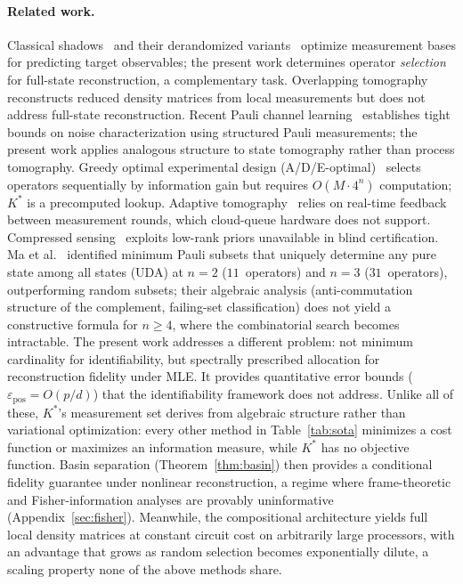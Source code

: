 \documentclass[twocolumn,prx,aps,superscriptaddress,longbibliography,floatfix]{revtex4-2}
\begin{document}
\paragraph{Related work.}
Classical shadows~\cite{Aaronson2018,Huang2020,Acharya2021,King2025} and
their derandomized
variants~\cite{Huang2021,Hadfield2022} optimize measurement bases
for predicting target observables; the present work determines
operator \emph{selection} for full-state reconstruction, a
complementary task.  Overlapping tomography~\cite{Cotler2020}
reconstructs reduced density matrices from local measurements
but does not address full-state reconstruction.
Recent Pauli channel learning~\cite{ChenFlammia2024}
establishes tight bounds on noise characterization using structured
Pauli measurements; the present work applies analogous structure
to state tomography rather than process tomography.
Greedy optimal experimental design
(A/D/E-optimal)~\cite{Pukelsheim2006,Flammia2011,Granade2017} selects
operators sequentially by information gain but requires $O(M \cdot 4^n)$
computation; $K^*$ is a precomputed lookup.  Adaptive
tomography~\cite{Mahler2013,Huszar2012} relies on real-time
feedback between measurement rounds, which cloud-queue hardware
does not support.  Compressed sensing~\cite{Gross2010,Cramer2010} exploits
low-rank priors unavailable in blind certification.
Ma et al.~\cite{Ma2016} identified minimum Pauli subsets
that uniquely determine any pure state among all states (UDA)
at $n = 2$ ($11$~operators) and $n = 3$ ($31$~operators),
outperforming random subsets; their algebraic analysis
(anti-commutation structure of the complement, failing-set
classification) does not yield a constructive
formula for $n \ge 4$, where the combinatorial search becomes
intractable.
The present work addresses a different problem: not minimum
cardinality for identifiability, but spectrally prescribed
allocation for reconstruction fidelity under MLE. It provides
quantitative error bounds ($\varepsilon_{\mathrm{pos}} = O(p/d)$)
that the identifiability framework does not address.
Unlike all of these, $K^*$'s measurement set derives from
algebraic structure rather than variational optimization: every
other method in Table~\ref{tab:sota} minimizes a cost function or
maximizes an information measure, while $K^*$ has no objective
function.  Basin separation (Theorem~\ref{thm:basin}) then
provides a conditional fidelity guarantee under nonlinear
reconstruction, a regime where
frame-theoretic and Fisher-information analyses are provably
uninformative (Appendix~\ref{sec:fisher}).  Meanwhile, the
compositional architecture yields full local density matrices at
constant circuit cost on arbitrarily large processors, with an
advantage that grows as random selection becomes exponentially
dilute, a scaling property none of the above methods share.
\end{document}
